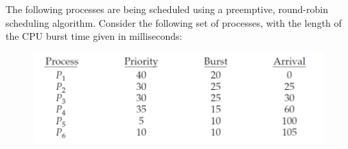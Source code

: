 \begin{exercise}[]{The following processes are being scheduled using a preemptive, round-robin scheduling algorithm.
    Consider the following set of processes, with the length of the CPU burst time given in milliseconds:
    \begin{figure}[h]
        \begin{center}
            \includegraphics[scale=1]{a2.pdf}
        \end{center}
    \end{figure}
    
}
\end{exercise}
